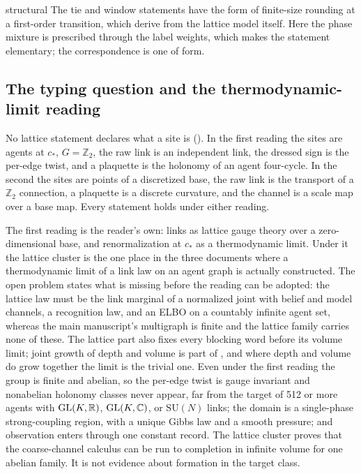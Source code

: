 \begin{analogy}{structural}
The tie and window statements have the form of finite-size rounding at a first-order transition, which
\citet{BorgsKotecky1990} derive from the lattice model itself. Here the phase mixture is prescribed through the
label weights, which makes the statement elementary; the correspondence is one of form.
\end{analogy}

\subsection{The typing question and the thermodynamic-limit reading}
\label{comp:sb-typing}

No lattice statement declares what a site is (). In the first reading the sites
are agents at \(c_*\), \(G=\mathbb Z_2\), the raw link is an independent link, the dressed sign is the per-edge
twist, and a plaquette is the holonomy of an agent four-cycle. In the second the sites are points of a
discretized base, the raw link is the transport of a \(\mathbb Z_2\) connection, a plaquette is a discrete
curvature, and the channel is a scale map over a base map. Every statement holds under either reading.

The first reading is the reader's own: links as lattice gauge theory over a zero-dimensional base, and
renormalization at \(c_*\) as a thermodynamic limit. Under it the lattice cluster is the one place in the
three documents where a thermodynamic limit of a link law on an agent graph is actually constructed. The
open problem
states what is missing before the reading can be adopted: the lattice law must be the link marginal of a
normalized joint with belief and model channels, a recognition law, and an ELBO on a countably infinite
agent set, whereas the main manuscript's multigraph is finite and the lattice family carries none of these.
The lattice part also fixes every blocking word before its volume limit; joint growth of depth and volume
is part of , and where depth and volume do grow together the limit is the
trivial one. Even under the first reading the group is finite and abelian, so the per-edge twist is gauge
invariant and nonabelian holonomy classes never appear, far from the target of 512 or more agents with
\(\mathrm{GL}(K,\mathbb R)\), \(\mathrm{GL}(K,\mathbb C)\), or \(\mathrm{SU}(N)\) links; the domain is a single-phase strong-coupling
region, with a unique Gibbs law and a smooth pressure; and observation enters through one constant record. The lattice cluster proves that the
coarse-channel calculus can be run to completion in infinite volume for one abelian family. It is not
evidence about formation in the target class.

